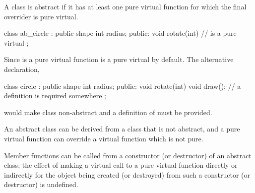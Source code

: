 \pnum
{}%
A class is abstract if it has at least one pure virtual
function for which the final overrider is pure virtual.
\begin{example}
\begin{codeblock}
class ab_circle : public shape {
  int radius;
public:
  void rotate(int) { }
  //  is a pure virtual
};
\end{codeblock}

Since  is a pure virtual function
 is a pure virtual by default. The alternative
declaration,
\begin{codeblock}
class circle : public shape {
  int radius;
public:
  void rotate(int) { }
  void draw();                  // a definition is required somewhere
};
\end{codeblock}
would make class  non-abstract and a definition of
 must be provided.
\end{example}

\pnum
\begin{note}
An abstract class can be derived from a class that is not abstract, and
a pure virtual function can override a virtual function which is not
pure.
\end{note}

\pnum
{}%
Member functions can be called from a constructor (or destructor) of an
abstract class;
%
the effect of making a virtual call to a pure
virtual function directly or indirectly for the object being created (or
destroyed) from such a constructor (or destructor) is undefined.%
%
%
%
%
%

